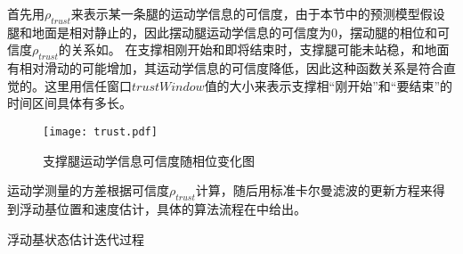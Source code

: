 首先用$\rho_{trust}$来表示某一条腿的运动学信息的可信度，由于本节中的预测模型假设腿和地面是相对静止的，因此摆动腿运动学信息的可信度为0，摆动腿的相位和可信度$\rho_{trust}$的关系如。
在支撑相刚开始和即将结束时，支撑腿可能未站稳，和地面有相对滑动的可能增加，其运动学信息的可信度降低，因此这种函数关系是符合直觉的。这里用信任窗口$trustWindow$值的大小来表示支撑相“刚开始”和“要结束”的时间区间具体有多长。
\begin{figure}[htbp]
    \centering
    \texttt{[image: trust.pdf]}
    \caption{\label{fig:kin_trust}支撑腿运动学信息可信度随相位变化图}
\end{figure}
运动学测量的方差根据可信度$\rho_{trust}$计算，随后用标准卡尔曼滤波的更新方程来得到浮动基位置和速度估计，具体的算法流程在中给出。
\begin{algorithm}[htbp]
\caption{浮动基状态估计迭代过程} 
\label{alg:com_state_est} 
\begin{algorithmic}[1] %
\ENDIF
{}
\end{algorithmic}
\end{algorithm}
